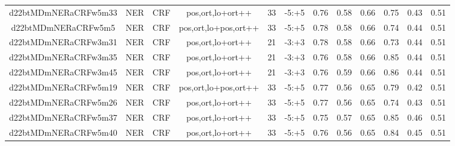\documentclass[a4paper]{article}
\begin{document}
\begin{landscape}
\begin{center}
\begin{tabular}{ |c|c|c|c|c|c|c|c|c|c|c|c|}
 
 	
 	\small{ d22btMDmNERaCRFw5m33 } & \small{ NER} & \small{  CRF }  & pos,ort,lo+ort++  &  33 &  \small{  -5:+5 }  &  0.76 & 0.58 & 0.66  &  0.75 & 0.43 & 0.51 \\
 	

 
 	
 	\small{ d22btMDmNERaCRFw5m5 } & \small{ NER} & \small{  CRF }  & pos,ort,lo+pos,ort++  &  33 &  \small{  -5:+5 }  &  0.78 & 0.58 & 0.66  &  0.74 & 0.44 & 0.51 \\
 	

 
 	
 	\small{ d22btMDmNERaCRFw3m31 } & \small{ NER} & \small{  CRF }  & pos,ort,lo+ort++  &  21 &  \small{  -3:+3 }  &  0.78 & 0.58 & 0.66  &  0.73 & 0.44 & 0.51 \\
 	

 
 	
 	\small{ d22btMDmNERaCRFw3m35 } & \small{ NER} & \small{  CRF }  & pos,ort,lo+ort++  &  21 &  \small{  -3:+3 }  &  0.76 & 0.58 & 0.66  &  0.85 & 0.44 & 0.51 \\
 	

 
 	
 	\small{ d22btMDmNERaCRFw3m45 } & \small{ NER} & \small{  CRF }  & pos,ort,lo+ort++  &  21 &  \small{  -3:+3 }  &  0.76 & 0.59 & 0.66  &  0.86 & 0.44 & 0.51 \\
 	

 
 	
 	\small{ d22btMDmNERaCRFw5m19 } & \small{ NER} & \small{  CRF }  & pos,ort,lo+pos,ort++  &  33 &  \small{  -5:+5 }  &  0.77 & 0.56 & 0.65  &  0.79 & 0.42 & 0.51 \\
 	

 
 	
 	\small{ d22btMDmNERaCRFw5m26 } & \small{ NER} & \small{  CRF }  & pos,ort,lo+ort++  &  33 &  \small{  -5:+5 }  &  0.77 & 0.56 & 0.65  &  0.74 & 0.43 & 0.51 \\
 	

 
 	
 	\small{ d22btMDmNERaCRFw5m37 } & \small{ NER} & \small{  CRF }  & pos,ort,lo+ort++  &  33 &  \small{  -5:+5 }  &  0.75 & 0.57 & 0.65  &  0.85 & 0.46 & 0.51 \\
 	

 
 	
 	\small{ d22btMDmNERaCRFw5m40 } & \small{ NER} & \small{  CRF }  & pos,ort,lo+ort++  &  33 &  \small{  -5:+5 }  &  0.76 & 0.56 & 0.65  &  0.84 & 0.45 & 0.51 \\
 	


\end{tabular}
\end{center}
\end{landscape}
\end{document}
